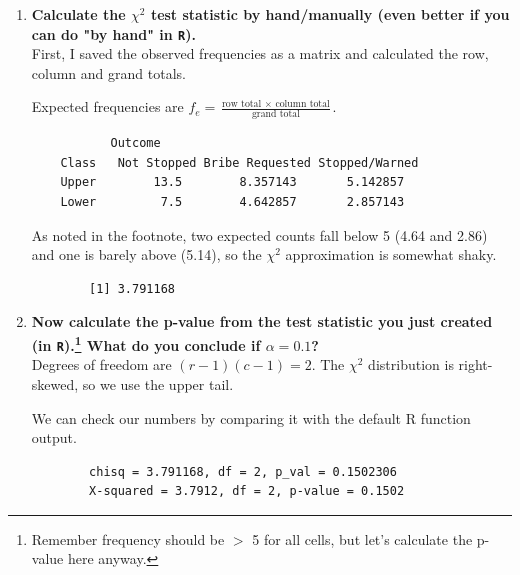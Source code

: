 \documentclass[12pt,letterpaper]{article}
\begin{document}
\begin{enumerate}
	
	\item [(a)]
	\textbf{Calculate the $\chi^2$ test statistic by hand/manually (even better if you can do "by hand" in \texttt{R}).}\\
	
	\noindent First, I saved the observed frequencies as a matrix and calculated the row, column and grand totals.
	
	
	Expected frequencies are $f_e = \frac{\text{row total }\times\text{ column total}}{\text{grand total}}$.
	
	\begin{verbatim}
	       Outcome
	Class   Not Stopped Bribe Requested Stopped/Warned
	Upper        13.5        8.357143       5.142857
	Lower         7.5        4.642857       2.857143
	\end{verbatim}
	As noted in the footnote, two expected counts fall below 5 (4.64 and 2.86) and one is barely above (5.14), so the $\chi^2$ approximation is somewhat shaky.
	
	
	\begin{verbatim}
		[1] 3.791168
	\end{verbatim}
	
	\item [(b)]
	\textbf{Now calculate the p-value from the test statistic you just created (in \texttt{R}).\footnote{Remember frequency should be $>$ 5 for all cells, but let's calculate the p-value here anyway.}  What do you conclude if $\alpha = 0.1$?}\\
	
	\noindent Degrees of freedom are $(r-1)(c-1) = 2$. The $\chi^2$ distribution is right-skewed, so we use the upper tail.
	
	
	
	We can check our numbers by comparing it with the default R function output.
	
	
	\begin{verbatim}
		chisq = 3.791168, df = 2, p_val = 0.1502306
		X-squared = 3.7912, df = 2, p-value = 0.1502
	\end{verbatim}
	

\end{enumerate}
\end{document}
